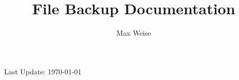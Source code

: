 \documentclass[12pt, a4paper, draft]{scrreprt}
\title{File Backup Documentation}
\author{Max Weise}
\begin{document}
\deckblatt
{\thetitle}
{\theauthor}
{}
{}
{Last Update: \today}
{}

\newpage

\tableofcontents










\end{document}
